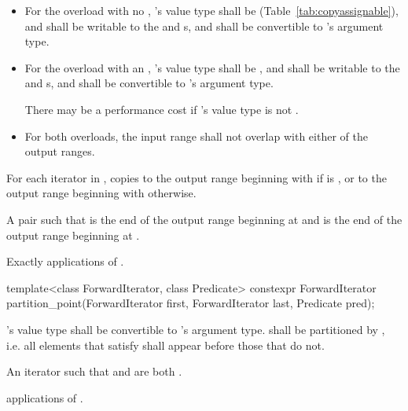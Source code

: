 \begin{itemdescr}
\pnum
\requires
\begin{itemize}
\item
For the overload with no , 's
value type shall be  (Table~\ref{tab:copyassignable}),
and shall be writable to the 
and  s, and shall be convertible to
's argument type.

\item
For the overload with an , 's
value type shall be , and shall be writable to the
 and  s, and shall be
convertible to 's argument type.
\begin{note}
There may be a performance cost if 's value type is not
.
\end{note}

\item
For both overloads, the input range shall not overlap with either of the output ranges.
\end{itemize}

\pnum
\effects For each iterator  in , copies  to the output range beginning with  if  is , or to the output range beginning with  otherwise.

\pnum
\returns A pair  such that  is the end of the output range beginning at  and  is the end of the output range beginning at .

\pnum
\complexity Exactly  applications of .
\end{itemdescr}

%
\begin{itemdecl}
template<class ForwardIterator, class Predicate>
  constexpr ForwardIterator
    partition_point(ForwardIterator first, ForwardIterator last,
                    Predicate pred);
\end{itemdecl}


\begin{itemdescr}
\pnum
\requires {}'s value type shall be convertible to 's argument type.  shall be partitioned by , i.e. all elements that satisfy  shall appear before those that do not.

\pnum
\returns An iterator  such that  and  are both .

\pnum
\complexity {} applications of .
\end{itemdescr}

